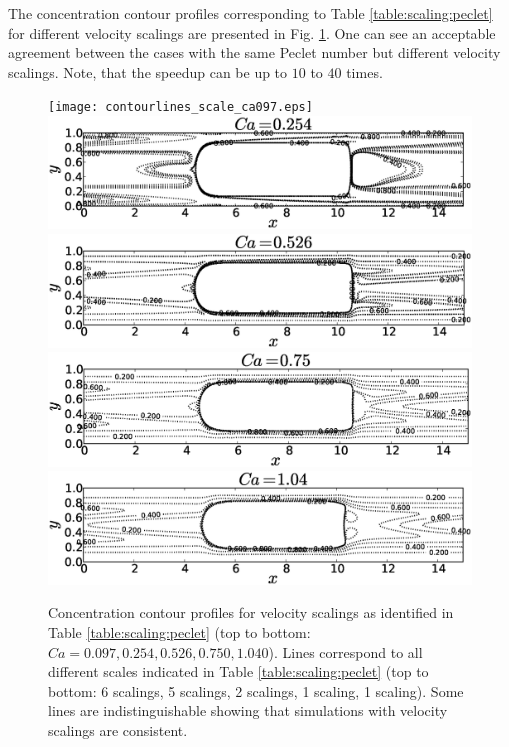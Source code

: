 \documentclass[preprint,12pt]{elsarticle}
\begin{document}
The concentration contour profiles corresponding to Table \ref{table:scaling:peclet} for different
velocity scalings are presented in Fig. \ref{fig:contours:scaling:peclet}. One can see an
acceptable agreement between the cases with the same Peclet number but different velocity scalings. Note, that the speedup can be up to $10$ to $40$ times.
\begin{figure}[htb!]
\texttt{[image: contourlines\_scale\_ca097.eps]}\\
\includegraphics[height=0.25\textwidth]{contourlines_scale_ca054.eps}\\
\includegraphics[height=0.25\textwidth]{contourlines_scale_ca026.eps}\\
\includegraphics[height=0.25\textwidth]{contourlines_scale_ca05.eps}\\
\includegraphics[height=0.25\textwidth]{contourlines_scale_ca14.eps}\\
\caption{Concentration contour profiles for velocity scalings as identified in Table
\ref{table:scaling:peclet} (top to bottom:
$Ca=0.097,0.254,0.526,0.750,1.040$). Lines correspond to
all different scales indicated in Table
\ref{table:scaling:peclet} (top to bottom: 6 scalings, 5 scalings, 2 scalings, 1 scaling, 1 scaling). Some lines are indistinguishable showing that simulations with velocity scalings are consistent.  \label{fig:contours:scaling:peclet}}
\end{figure}
\end{document}
